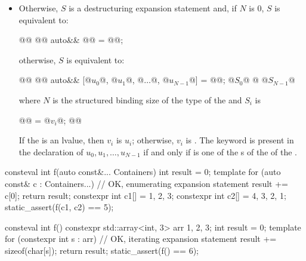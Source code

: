 \begin{itemize}
\item
Otherwise, $S$ is a destructuring expansion statement and,
if $N$ is $0$, $S$ is equivalent to:
\begin{codeblock}
{
  @@
  @@ auto&& @@ = @@;
}
\end{codeblock}
otherwise, $S$ is equivalent to:
\begin{codeblock}
{
  @@
  @@ auto&& [@$u_{0}$@, @$u_{1}$@, @$\dotsc$@, @$u_{N-1}$@] = @@;
  @$S_{0}$@
  @\vdots@
  @$S_{N-1}$@
}
\end{codeblock}
where $N$ is the structured binding size of the type
of the  and $S_{i}$ is
\begin{codeblock}
{
  @@ = @$v_{i}$@;
  @@
}
\end{codeblock}
If the  is an lvalue, then
$v_{i}$ is $u_{i}$;
otherwise, $v_{i}$ is .
The keyword  is present in the declaration
of $u_{0}, u_{1}, \dotsc, u_{N-1}$ if and only if
 is one of the s
of the 
of the .
\end{itemize}

\pnum
\begin{example}
\begin{codeblock}
consteval int f(auto const&... Containers) {
  int result = 0;
  template for (auto const& c : {Containers...}) {      // OK, enumerating expansion statement
    result += c[0];
  }
  return result;
}
constexpr int c1[] = {1, 2, 3};
constexpr int c2[] = {4, 3, 2, 1};
static_assert(f(c1, c2) == 5);
\end{codeblock}
\end{example}

\pnum
\begin{example}
\begin{codeblock}
consteval int f() {
  constexpr std::array<int, 3> arr {1, 2, 3};
  int result = 0;
  template for (constexpr int s : arr) {                // OK, iterating expansion statement
    result += sizeof(char[s]);
  }
  return result;
}
static_assert(f() == 6);
\end{codeblock}
\end{example}

